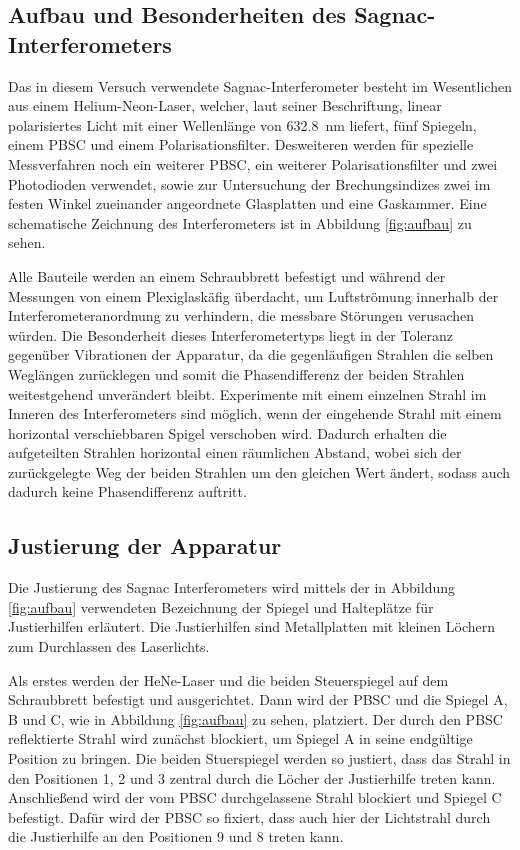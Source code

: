 \subsection{Aufbau und Besonderheiten des Sagnac-Interferometers}
Das in diesem Versuch verwendete Sagnac-Interferometer besteht im Wesentlichen aus einem Helium-Neon-Laser, welcher, laut seiner Beschriftung, linear polarisiertes Licht mit einer Wellenlänge von \SI{632.8}{\nano\metre} \cite{V64} liefert, fünf Spiegeln, einem PBSC und einem Polarisationsfilter. Desweiteren werden für spezielle Messverfahren noch ein weiterer PBSC, ein weiterer Polarisationsfilter und zwei Photodioden verwendet, sowie zur Untersuchung der Brechungsindizes zwei im festen Winkel zueinander angeordnete Glasplatten und eine Gaskammer. Eine schematische Zeichnung des Interferometers ist in Abbildung \ref{fig:aufbau} zu sehen.

Alle Bauteile werden an einem Schraubbrett befestigt und während der Messungen von einem Plexiglaskäfig überdacht, um Luftströmung innerhalb der Interferometeranordnung zu verhindern, die messbare Störungen verusachen würden. Die Besonderheit dieses Interferometertyps liegt in der Toleranz gegenüber Vibrationen der Apparatur, da die gegenläufigen Strahlen die selben Weglängen zurücklegen und somit die Phasendifferenz der beiden Strahlen weitestgehend unverändert bleibt. Experimente mit einem einzelnen Strahl im Inneren des Interferometers sind möglich, wenn der eingehende Strahl mit einem horizontal verschiebbaren Spigel verschoben wird. Dadurch erhalten die aufgeteilten Strahlen horizontal einen räumlichen Abstand, wobei sich der zurückgelegte Weg der beiden Strahlen um den gleichen Wert ändert, sodass auch dadurch keine Phasendifferenz auftritt.

\subsection{Justierung der Apparatur}
Die Justierung des Sagnac Interferometers wird mittels der in Abbildung \ref{fig:aufbau} verwendeten Bezeichnung der Spiegel und Halteplätze für Justierhilfen erläutert. Die Justierhilfen
sind Metallplatten mit kleinen Löchern zum Durchlassen des Laserlichts.

Als erstes werden der HeNe-Laser und die beiden Steuerspiegel auf dem Schraubbrett befestigt und ausgerichtet. Dann wird der PBSC und die Spiegel A, B und C, wie in Abbildung \ref{fig:aufbau} zu sehen, platziert. Der durch den PBSC reflektierte Strahl wird zunächst blockiert, um Spiegel A in seine endgültige Position zu bringen. Die beiden Stuerspiegel werden so justiert, dass das Strahl in den Positionen 1, 2 und 3 zentral durch die Löcher der Justierhilfe treten kann. Anschließend wird der vom PBSC durchgelassene Strahl blockiert und Spiegel C befestigt. Dafür wird der PBSC so fixiert, dass auch hier der Lichtstrahl durch die Justierhilfe an den Positionen 9 und 8 treten kann.


